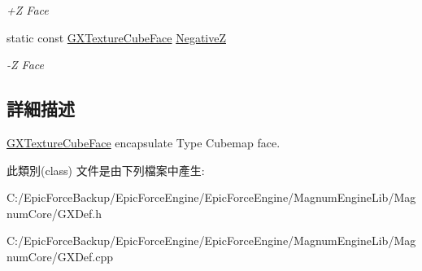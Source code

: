 \begin{DoxyCompactItemize}
\begin{DoxyCompactList}\small\item\em +Z Face \end{DoxyCompactList}\item 
static const \hyperlink{class_magnum_1_1_g_x_texture_cube_face}{G\+X\+Texture\+Cube\+Face} \hyperlink{class_magnum_1_1_g_x_texture_cube_face_ae7e28835f8b97fb94dbf7a8e0fdb9e7a}{NegativeZ}\hypertarget{class_magnum_1_1_g_x_texture_cube_face_ae7e28835f8b97fb94dbf7a8e0fdb9e7a}{}\label{class_magnum_1_1_g_x_texture_cube_face_ae7e28835f8b97fb94dbf7a8e0fdb9e7a}

\begin{DoxyCompactList}\small\item\em -\/Z Face \end{DoxyCompactList}\end{DoxyCompactItemize}


\subsection{詳細描述}
\hyperlink{class_magnum_1_1_g_x_texture_cube_face}{G\+X\+Texture\+Cube\+Face} encapsulate Type Cubemap face. 

此類別(class) 文件是由下列檔案中產生\+:\begin{DoxyCompactItemize}
\item 
C\+:/\+Epic\+Force\+Backup/\+Epic\+Force\+Engine/\+Epic\+Force\+Engine/\+Magnum\+Engine\+Lib/\+Magnum\+Core/G\+X\+Def.\+h\item 
C\+:/\+Epic\+Force\+Backup/\+Epic\+Force\+Engine/\+Epic\+Force\+Engine/\+Magnum\+Engine\+Lib/\+Magnum\+Core/G\+X\+Def.\+cpp\end{DoxyCompactItemize}
